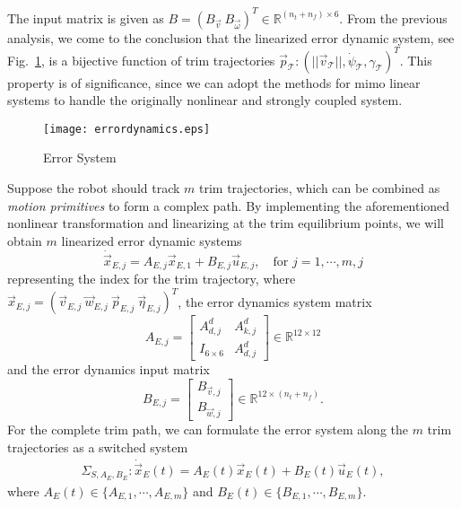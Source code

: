 The input matrix is given as $B=(B_{\vec{v}}~B_{\vec{\omega}})^{T} \in \mathbb{R}^{(n_{t}+n_{f})\times 6}$.
From the previous analysis, we come to the conclusion that the linearized error dynamic system, see Fig.~\ref{ErrorSystem}, is a bijective function of trim trajectories $\vec{p}_{\mathcal{T}}:(||\vec{v}_{\mathcal{T}}||,   \dot{\psi}_{\mathcal{T}}, \gamma_{\mathcal{T}})^{T}$. This property is of significance, since we can adopt the methods for \ac{mimo} linear systems to handle the originally nonlinear and strongly coupled system. 
\setlength{\arraycolsep}{5pt}
\begin{figure}
\centering
\texttt{[image: errordynamics.eps]}
\caption{Error System}
\label{ErrorSystem}
\end{figure}
Suppose the robot should track $m$ trim trajectories, which can be combined as \emph{motion primitives} to form a complex path. By implementing the aforementioned nonlinear transformation and linearizing at the trim equilibrium points, we will obtain $m$ linearized error dynamic systems 
\begin{equation}
 	\dot{\vec{x}}_{E,j}=A_{E,j}\vec{x}_{E,1}+B_{E,j}\vec{u}_{E,j}, \quad \text{for} \,\, j=1, \cdots, m, j
 \end{equation} 
 representing the index for the trim trajectory, where $\vec{x}_{E,j}=(\vec{v}_{E,j}~\vec{w}_{E,j}~\vec{p}_{E,j}~\vec{\eta}_{E,j})^{T}$, the error dynamics system matrix
\begin{equation}
A_{E,j}=
\begin{bmatrix}
A_{d,j}^{d}&A_{k,j}^{d}\\
I_{6 \times 6}&A_{d,j}^{d}
\end{bmatrix} \in \mathbb{R}^{12 \times 12}
\end{equation}
and the error dynamics input matrix 
\begin{equation}
B_{E,j}=
\begin{bmatrix}
B_{\vec{v},j} \\
B_{\vec{w},j} 
\end{bmatrix} \in \mathbb{R}^{12 \times (n_{t}+n_{f})}.
\end{equation}
For the complete trim path, we can formulate the error system along the $m$ trim trajectories as a switched system
\begin{align}
\Sigma_{S,A_{E},B_{E}}: \dot{\vec{x}}_{E}(t)=
A_{E}(t)\vec{x}_{E}(t)+B_{E}(t)\vec{u}_{E}(t),
\end{align}
where $A_{E}(t)\in\lbrace A_{E,1}, \cdots, A_{E,m}\rbrace$ and $B_{E}(t)\in\lbrace B_{E,1}, \cdots, B_{E,m}\rbrace$.
